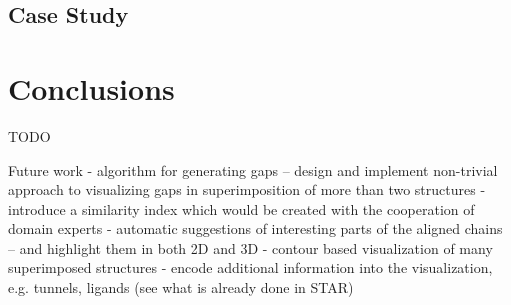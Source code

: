 \documentclass[twocolumn]{bmcart}%
\begin{document}
\subsection*{Case Study}

\section*{Conclusions}
TODO

Future work
- algorithm for generating gaps -- design and implement non-trivial approach to visualizing gaps in superimposition of more than two structures
- introduce a similarity index which would be created with the cooperation of domain experts
- automatic suggestions of interesting parts of the aligned chains -- and highlight them in both 2D and 3D
- contour based visualization of many superimposed structures
- encode additional information into the visualization, e.g. tunnels, ligands (see what is already done in STAR)
\end{document}
